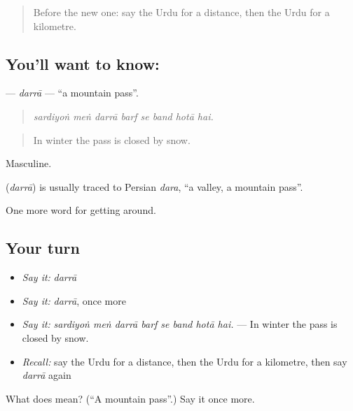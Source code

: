 \begin{quote}
Before the new one: say the Urdu for a distance, then the Urdu for a kilometre.
\end{quote}

\subsection*{You'll want to know: }
\textbf{} — \emph{darrā} — \textquotedblleft{}a mountain pass\textquotedblright{}.

\begin{quote}
       
\end{quote}

\begin{quote}
\emph{sardiyoṅ meṅ darrā barf se band hotā hai.}
\end{quote}

\begin{quote}
In winter the pass is closed by snow.
\end{quote}

Masculine.

\begin{cousinweb}
\textbf{} (\emph{darrā}) is usually traced to Persian \emph{dara}, \textquotedblleft{}a valley, a mountain pass\textquotedblright{}.
\end{cousinweb}

\begin{grammarlens}[title={What you've built}]
One more word for getting around.
\end{grammarlens}

\subsection*{Your turn}
\begin{itemize}
\raggedright
  \item \emph{Say it:} \emph{darrā}
  \item \emph{Say it:} \emph{darrā}, once more
  \item \emph{Say it:} \emph{sardiyoṅ meṅ darrā barf se band hotā hai.} — In winter the pass is closed by snow.
  \item \emph{Recall:} say the Urdu for a distance, then the Urdu for a kilometre, then say \emph{darrā} again
\end{itemize}

\begin{tcolorbox}[breakable,colback=teal!4,colframe=teal!35!black,title={Before you move on}]
What does  mean? (\textquotedblleft{}A mountain pass\textquotedblright{}.) Say it once more.
\end{tcolorbox}
